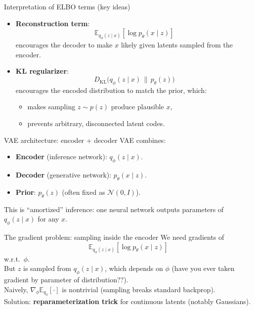 \documentclass[aspectratio=169]{beamer}
\newcommand{\E}{\mathbb{E}}
\newcommand{\KL}{D_{\mathrm{KL}}}
\newcommand{\cN}{\mathcal{N}}
\begin{document}
\begin{frame}{Interpretation of ELBO terms (key ideas)}
\begin{itemize}
  \item \textbf{Reconstruction term}:
  \[
  \E_{q_\phi(z\mid x)}[\log p_\theta(x\mid z)]
  \]
  encourages the decoder to make $x$ likely given latents sampled from the encoder.
  \item \textbf{KL regularizer}:
  \[
  \KL\big(q_\phi(z\mid x)\,\|\,p_\theta(z)\big)
  \]
  encourages the encoded distribution to match the prior, which:
  \begin{itemize}
    \item makes sampling $z\sim p(z)$ produce plausible $x$,
    \item prevents arbitrary, disconnected latent codes.
  \end{itemize}
\end{itemize}
\end{frame}

\begin{frame}{VAE architecture: encoder + decoder}
VAE combines:
\begin{itemize}
  \item \textbf{Encoder} (inference network): $q_\phi(z\mid x)$.
  \item \textbf{Decoder} (generative network): $p_\theta(x\mid z)$.
  \item \textbf{Prior}: $p_\theta(z)$ (often fixed as $\cN(0,I)$).
\end{itemize}
This is ``amortized'' inference: one neural network outputs parameters of $q_\phi(z\mid x)$ for any $x$.
\end{frame}

\begin{frame}{The gradient problem: sampling inside the encoder}
We need gradients of
\[
\E_{q_\phi(z\mid x)}[\log p_\theta(x\mid z)]
\]
w.r.t.\ $\phi$.\\[1.0em]

But $z$ is sampled from $q_\phi(z\mid x)$, which depends on $\phi$ (have you ever taken gradient by parameter of distribution??).\\[1.0em]

Naively, $\nabla_\phi \E_{q_\phi}[\cdot]$ is nontrivial (sampling breaks standard backprop).\\[1.0em]

Solution: \textbf{reparameterization trick} for continuous latents (notably Gaussians).
\end{frame}
\end{document}
